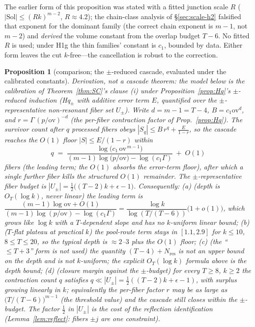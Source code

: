 \documentclass[11pt,a4paper]{article}
\numberwithin{equation}{section}
\theoremstyle{plain}
\newtheorem{proposition}[theorem]{Proposition}
\theoremstyle{definition}
\theoremstyle{remark}
\begin{document}
The earlier form of this proposition was stated with a fitted junction
scale $R$ ($|\mathrm{Sol}|\le(Rk)^{m-2}$, $R\approx4.2$); the chain-class
analysis of \S\ref{sec:scale-h2} falsified that exponent for the
dominant family (the correct chain exponent is $m-1$, not $m-2$) and
\emph{derived} the volume constant from the overlap budget $T-6$. No
fitted $R$ is used; under H1g the thin families' constant is $c_1$,
bounded by data. Either form leaves the cut $k$-free---the cancellation
is robust to the correction.

\begin{proposition}[comparison; the $\pm$-reduced cascade, evaluated under
the calibrated constants]
\label{prop:depth}
\emph{Derivation, not a cascade theorem}: the model below is the
calibration of Theorem~\ref{thm:SC}'s clause (i) under
Proposition~\ref{prop:Hq}'s $\pm$-reduced induction (Hq$_\pm$ with additive
error term $E$, quantified over the $\pm$-representative non-resonant fiber
set $U_\pm$). Write $d=m-1=T-4$, $B=c_1\mathrm{ov}^{d}$, and
$r=\Gamma\,(p/\mathrm{ov})^{-d}$ (the per-fiber contraction factor of
Prop.~\ref{prop:Hq}). The survivor count after $q$ processed fibers obeys
$|S_q|\le B\,r^{q}+\tfrac{E}{1-r}$, so the cascade reaches the $O(1)$ floor
$|S|\le E/(1-r)$ within
\[
q\;=\;\frac{\log\!\bigl(c_1\,\mathrm{ov}^{\,m-1}\bigr)}
{(m-1)\log\!\bigl(p/\mathrm{ov}\bigr)-\log(c_1\Gamma)}\;+\;O(1)
\]
fibers (the leading term; the $O(1)$ absorbs the error-term floor), after
which a single further fiber kills the structured $O(1)$ remainder. The
$\pm$-representative fiber budget is $|U_\pm|=\tfrac12\bigl((T-2)k+\epsilon-1\bigr)$.
Consequently:
\emph{(a)} (depth is $O_T(\log k)$, never linear) the leading term is
$\dfrac{(m-1)\log\mathrm{ov}+O(1)}{(m-1)\log(p/\mathrm{ov})-\log(c_1\Gamma)}
=\dfrac{\log k}{\log(T/(T-6))}\bigl(1+o(1)\bigr)$, which grows like $\log k$
with a $T$-dependent slope and has \emph{no} $k$-uniform linear bound;
\emph{(b)} ($T$-flat plateau at practical $k$) the pool-route term stays in
$[1.1,2.9]$ for $k\le10$, $8\le T\le20$, so the typical depth is
$\approx 2$--$3$ plus the $O(1)$ floor;
\emph{(c)} (the ``$\le T+3$'' form is not used) the quantity
$(T-4)+N_{\mathrm{res}}$ is \emph{not} an upper bound on
the depth and is not $k$-uniform; the explicit
$O_T(\log k)$ formula above is the depth bound;
\emph{(d)} (closure margin against the $\pm$-budget) for every $T\ge8$,
$k\ge2$ the contraction count $q$ satisfies $q\ll|U_\pm|=\tfrac12((T-2)k+\epsilon-1)$,
with surplus growing linearly in $k$; equivalently the per-fiber factor $r$
may be as large as $\bigl(T/(T-6)\bigr)^{m-1}$ (the threshold value) and the
cascade still closes within the $\pm$-budget. The factor $\tfrac12$ in
$|U_\pm|$ is the cost of the reflection identification
(Lemma~\ref{lem:reflect}: fibers $\pm j$ are one constraint).
\end{proposition}
\end{document}

